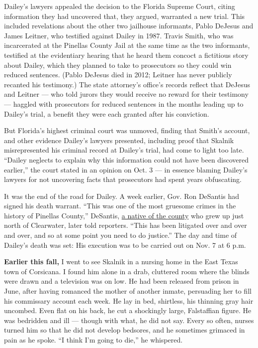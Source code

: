 Dailey's lawyers appealed the decision to the Florida Supreme Court,
citing information they had uncovered that, they argued, warranted a new
trial. This included revelations about the other two jailhouse
informants, Pablo DeJesus and James Leitner, who testified against
Dailey in 1987. Travis Smith, who was incarcerated at the Pinellas
County Jail at the same time as the two informants, testified at the
evidentiary hearing that he heard them concoct a fictitious story about
Dailey, which they planned to take to prosecutors so they could win
reduced sentences. (Pablo DeJesus died in 2012; Leitner has never
publicly recanted his testimony.) The state attorney's office's records
reflect that DeJesus and Leitner --- who told jurors they would receive
no reward for their testimony --- haggled with prosecutors for reduced
sentences in the months leading up to Dailey's trial, a benefit they
were each granted after his conviction.

But Florida's highest criminal court was unmoved, finding that Smith's
account, and other evidence Dailey's lawyers presented, including proof
that Skalnik misrepresented his criminal record at Dailey's trial, had
come to light too late. ``Dailey neglects to explain why this
information could not have been discovered earlier,'' the court stated
in an opinion on Oct. 3 --- in essence blaming Dailey's lawyers for not
uncovering facts that prosecutors had spent years obfuscating.

It was the end of the road for Dailey. A week earlier, Gov. Ron DeSantis
had signed his death warrant. ``This was one of the most gruesome crimes
in the history of Pinellas County,'' DeSantis,
\href{https://www.miamiherald.com/latest-news/article220303490.html}{a
native of the county} who grew up just north of Clearwater, later told
reporters. ``This has been litigated over and over and over, and so at
some point you need to do justice.'' The day and time of Dailey's death
was set: His execution was to be carried out on Nov. 7 at 6 p.m.

\textbf{Earlier this fall,} I went to see Skalnik in a nursing home in
the East Texas town of Corsicana. I found him alone in a drab, cluttered
room where the blinds were drawn and a television was on low. He had
been released from prison in June, after having romanced the mother of
another inmate, persuading her to fill his commissary account each week.
He lay in bed, shirtless, his thinning gray hair uncombed. Even flat on
his back, he cut a shockingly large, Falstaffian figure. He was
bedridden and ill --- though with what, he did not say. Every so often,
nurses turned him so that he did not develop bedsores, and he sometimes
grimaced in pain as he spoke. ``I think I'm going to die,'' he
whispered.

